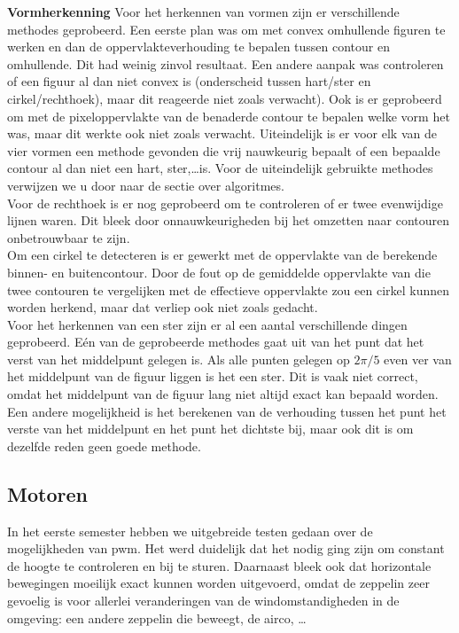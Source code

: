 \documentclass[eind]{penoverslag}
\begin{document}
\textbf{Vormherkenning}
Voor het herkennen van vormen zijn er verschillende methodes geprobeerd. Een eerste plan was om met convex omhullende figuren te werken en dan de oppervlakteverhouding te bepalen tussen contour en omhullende. Dit had weinig zinvol resultaat. Een andere aanpak was controleren of een figuur al dan niet convex is (onderscheid tussen hart/ster en cirkel/rechthoek), maar dit reageerde niet zoals verwacht). Ook is er geprobeerd om met de pixeloppervlakte van de benaderde contour te bepalen welke vorm het was, maar dit werkte ook niet zoals verwacht. Uiteindelijk is er voor elk van de vier vormen een methode gevonden die vrij nauwkeurig bepaalt of een bepaalde contour al dan niet een hart, ster,\ldots is. Voor de uiteindelijk gebruikte methodes verwijzen we u door naar de sectie over algoritmes.\\
Voor de rechthoek is er nog geprobeerd om te controleren of er twee evenwijdige lijnen waren. Dit bleek door onnauwkeurigheden bij het omzetten naar contouren onbetrouwbaar te zijn. \\
Om een cirkel te detecteren is er gewerkt met de oppervlakte van de berekende binnen- en buitencontour. Door de fout op de gemiddelde oppervlakte van die twee contouren te vergelijken met de effectieve oppervlakte zou een cirkel kunnen worden herkend, maar dat verliep ook niet zoals gedacht. \\
Voor het herkennen van een ster zijn er al een aantal verschillende dingen geprobeerd. E\'en van de geprobeerde methodes gaat uit van het punt dat het verst van het middelpunt gelegen is. Als alle punten gelegen op $2\pi/5$ even ver van het middelpunt van de figuur liggen is het een ster. Dit is vaak niet correct, omdat het middelpunt van de figuur lang niet altijd exact kan bepaald worden. Een andere mogelijkheid is het berekenen van de verhouding tussen het punt het verste van het middelpunt en het punt het dichtste bij, maar ook dit is om dezelfde reden geen goede methode.\\

\subsection{Motoren}
In het eerste semester hebben we uitgebreide testen gedaan over de mogelijkheden van pwm. Het werd duidelijk dat het nodig ging zijn om constant de hoogte te controleren en bij te sturen. Daarnaast bleek ook dat horizontale bewegingen moeilijk exact kunnen worden uitgevoerd, omdat de zeppelin zeer gevoelig is voor allerlei veranderingen van de windomstandigheden in de omgeving: een andere zeppelin die beweegt, de airco, \ldots \\
\end{document}
